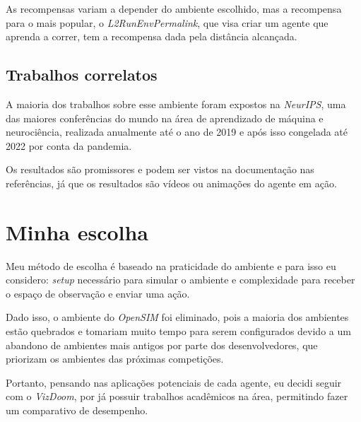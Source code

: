 \documentclass[12pt]{article}
\begin{document}
As recompensas variam a depender do ambiente escolhido, mas a recompensa para o mais popular, o \textit{L2RunEnvPermalink}, que visa criar um agente que aprenda a correr, tem a recompensa dada pela distância alcançada.

\subsection{Trabalhos correlatos}

A maioria dos trabalhos sobre esse ambiente foram expostos na \textit{NeurIPS}, uma das maiores conferências do mundo na área de aprendizado de máquina e neurociência, realizada anualmente até o ano de 2019 e após isso congelada até 2022 por conta da pandemia.

Os resultados são promissores e podem ser vistos na documentação nas referências, já que os resultados são vídeos ou animações do agente em ação.

\section{Minha escolha}

Meu método de escolha é baseado na praticidade do ambiente e para isso eu considero: \textit{setup} necessário para simular o ambiente e complexidade para receber o espaço de observação e enviar uma ação.

Dado isso, o ambiente do \textit{OpenSIM} foi eliminado, pois a maioria dos ambientes estão quebrados e tomariam muito tempo para serem configurados devido a um abandono de ambientes mais antigos por parte dos desenvolvedores, que priorizam os ambientes das próximas competições.

Portanto, pensando nas aplicações potenciais de cada agente, eu decidi seguir com o \textit{VizDoom}, por já possuir trabalhos acadêmicos na área, permitindo fazer um comparativo de desempenho.

\pagebreak
\printbibliography
\pagebreak
\end{document}
